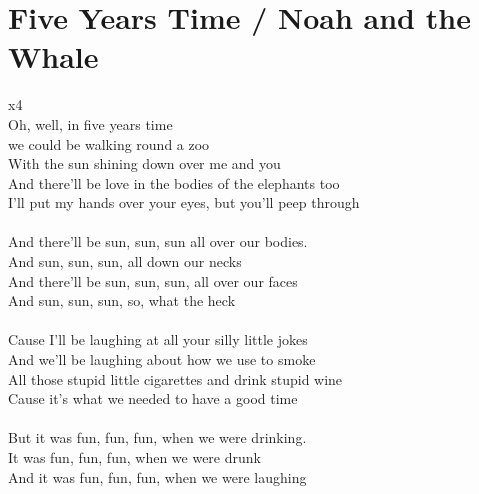 \section{Five Years Time / Noah and the Whale}\label{ch:fiveyearstime}
\Cmajor
\Fmajor
\Gmajor


               x4\\

Oh, well, in  five years  time\\
we could be  walking round a  zoo\\
With the  sun shining  down over  me and  you\\
And there'll be  love in the  bodies of the  elephants  too\\
I'll put my  hands over  your eyes, but  you'll peep  through\\
\\
And there'll be  sun, sun,  sun  all over our  bodies.\\
And  sun, sun,  sun,  all down our  necks\\
And there'll be  sun, sun,  sun,  all over our  faces\\
And  sun, sun,  sun,  so, what the  heck\\
\\
Cause I'll be  laughing at  all your  silly little  jokes\\
And we'll  be laughing about  how we  use to  smoke\\
All those  stupid little  cigarettes and  drink stupid  wine\\
Cause it's  what we  needed to  have a good  time\\
\\
But it was  fun, fun,  fun,  when we were  drinking.\\
It was  fun, fun,  fun,  when we were  drunk\\
And it was  fun, fun,  fun,  when we were  laughing\\
